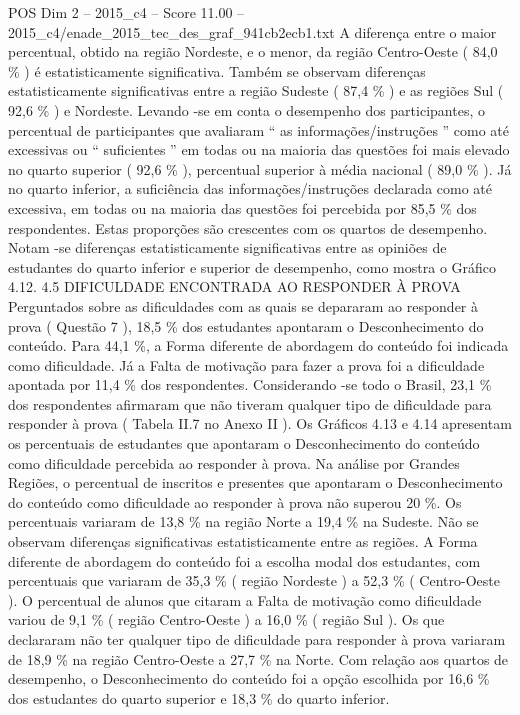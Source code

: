 \begin{textsample}{POS Dim 2 – 2015\_c4 – Score 11.00 – 2015\_c4/enade\_2015\_tec\_des\_graf\_941cb2ecb1.txt}
A diferença entre o maior percentual, obtido na região Nordeste, e o menor, da região Centro-Oeste ( 84,0 \% ) é estatisticamente significativa.
Também se observam diferenças estatisticamente significativas entre a região Sudeste ( 87,4 \% ) e as regiões Sul ( 92,6 \% ) e Nordeste.
Levando -se em conta o desempenho dos participantes, o percentual de participantes que avaliaram “ as informações/instruções ” como até excessivas ou “ suficientes ” em todas ou na maioria das questões foi mais elevado no quarto superior ( 92,6 \% ), percentual superior à média nacional ( 89,0 \% ).
Já no quarto inferior, a suficiência das informações/instruções declarada como até excessiva, em todas ou na maioria das questões foi percebida por 85,5 \% dos respondentes.
Estas proporções são crescentes com os quartos de desempenho.
Notam -se diferenças estatisticamente significativas entre as opiniões de estudantes do quarto inferior e superior de desempenho, como mostra o Gráfico 4.12. 4.5 DIFICULDADE ENCONTRADA AO RESPONDER À PROVA Perguntados sobre as dificuldades com as quais se depararam ao responder à prova ( Questão 7 ), 18,5 \% dos estudantes apontaram o Desconhecimento do conteúdo.
Para 44,1 \%, a Forma diferente de abordagem do conteúdo foi indicada como dificuldade.
Já a Falta de motivação para fazer a prova foi a dificuldade apontada por 11,4 \% dos respondentes.
Considerando -se todo o Brasil, 23,1 \% dos respondentes afirmaram que não tiveram qualquer tipo de dificuldade para responder à prova ( Tabela II.7 no Anexo II ).
Os Gráficos 4.13 e 4.14 apresentam os percentuais de estudantes que apontaram o Desconhecimento do conteúdo como dificuldade percebida ao responder à prova.
Na análise por Grandes Regiões, o percentual de inscritos e presentes que apontaram o Desconhecimento do conteúdo como dificuldade ao responder à prova não superou 20 \%.
Os percentuais variaram de 13,8 \% na região Norte a 19,4 \% na Sudeste.
Não se observam diferenças significativas estatisticamente entre as regiões.
A Forma diferente de abordagem do conteúdo foi a escolha modal dos estudantes, com percentuais que variaram de 35,3 \% ( região Nordeste ) a 52,3 \% ( Centro-Oeste ).
O percentual de alunos que citaram a Falta de motivação como dificuldade variou de 9,1 \% ( região Centro-Oeste ) a 16,0 \% ( região Sul ).
Os que declararam não ter qualquer tipo de dificuldade para responder à prova variaram de 18,9 \% na região Centro-Oeste a 27,7 \% na Norte.
Com relação aos quartos de desempenho, o Desconhecimento do conteúdo foi a opção escolhida por 16,6 \% dos estudantes do quarto superior e 18,3 \% do quarto inferior.

\end{textsample}
